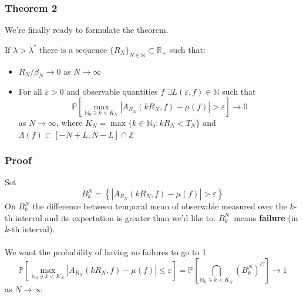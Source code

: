 \documentclass{beamer}
\begin{document}
\begin{frame}
    \frametitle{Theorem 2}

    We're finally ready to formulate the theorem.

    \begin{theorem}[Thermalization]
        If $\lambda > \lambda^*$ there is a sequence $\{R_N\}_{N \in \mathbb{N}} \subset \mathbb{R_+}$ such that:
        \begin{itemize}
            \item $R_N/\beta_N \rightarrow 0$ as $N\rightarrow \infty$
            \item For all $\varepsilon > 0$ and observable quantities $f$ $\exists L(\varepsilon, f) \in \mathbb{N}$ such that
                  \[
                      \mathbb{P}\left[ \max_{\mathbb{N}_0 \ni k < K_N}|A_{R_N}(kR_N, f) - \mu(f)| > \varepsilon\right] \rightarrow 0
                  \]
                  as $N \rightarrow \infty$, where $K_N = \max\{k \in \mathbb{N}_0: kR_N < T_N\}$ and $\Lambda(f) \subset [-N + L, N - L] \cap \mathbb{Z}$
        \end{itemize}
    \end{theorem}
\end{frame}

\begin{frame}
    \frametitle{Proof}
    Set 
    \[B^N_k = \left\{ |A_{R_N}(kR_N, f) - \mu(f)| > \varepsilon\right\}\]
    On $B^N_k$ the difference between temporal mean of observable measured over the $k$-th interval and its expectation is greater than we'd like to.
    $B^N_k$~means \textbf{failure} (in $k$-th interval).
    \\~\\
    We want the probability of having no failures to go to 1
    \[\mathbb{P}\left[ \max_{\mathbb{N}_0 \ni k < K_N}|A_{R_N}(kR_N, f) - \mu(f)| \leq \varepsilon   \right] =
    \mathbb{P}\left[ \bigcap_{\mathbb{N}_0 \ni k < K_N}\left(B^N_k\right)^C \right] \rightarrow 1 \]
    as $N\rightarrow\infty$
\end{frame}
\end{document}
